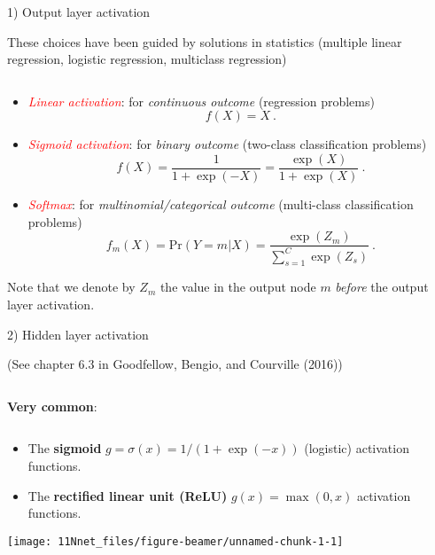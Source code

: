 \documentclass[
  10pt,
  ignorenonframetext,
]{beamer}
\providecommand{\tightlist}{%
  \setlength{\itemsep}{0pt}\setlength{\parskip}{0pt}}
\begin{document}
\begin{frame}
\begin{block}{1) Output layer activation}
\protect\hypertarget{output-layer-activation}{}
\(~\)

These choices have been guided by solutions in statistics (multiple
linear regression, logistic regression, multiclass regression)

\(~\)

\begin{itemize}
\item
  \emph{\textcolor{red}{Linear activation}}: for \emph{continuous
  outcome} (regression problems) \[f(X)=X \ .\]
\item
  \emph{\textcolor{red}{Sigmoid activation}}: for \emph{binary outcome}
  (two-class classification problems)
  \[f(X)=\frac{1}{1+\exp(-X)} = \frac{\exp(X)}{1+\exp(X)} \ .\]
\item
  \emph{\textcolor{red}{Softmax}}: for \emph{multinomial/categorical
  outcome} (multi-class classification problems) \[
  f_m(X) =  \text{Pr}(Y=m | X ) = \frac{\exp(Z_m)}{\sum_{s=1}^{C}\exp(Z_s)} \ .
  \]
\end{itemize}

\scriptsize

Note that we denote by \(Z_m\) the value in the output node \(m\)
\emph{before} the output layer activation.
\end{block}
\end{frame}

\begin{frame}
\begin{block}{2) Hidden layer activation}
\protect\hypertarget{hidden-layer-activation}{}
\tiny

(See chapter 6.3 in Goodfellow, Bengio, and Courville (2016))

\normalsize

\(~\)

\textbf{Very common}:

\(~\)

\begin{itemize}
\tightlist
\item
  The \textbf{sigmoid} \(g=\sigma(x)=1/(1+\exp(-x))\) (logistic)
  activation functions.
\item
  The \textbf{rectified linear unit (ReLU)} \(g(x)=\max(0,x)\)
  activation functions.
\end{itemize}

\vspace{2mm}

\centering

\texttt{[image: 11Nnet\_files/figure-beamer/unnamed-chunk-1-1]}
\end{block}
\end{frame}
\end{document}
